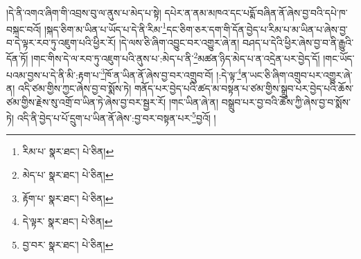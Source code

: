 །དེ་ནི་འགའ་ཞིག་གི་འབྲས་བུ་ལ་ནུས་པ་མེད་པ་སྟེ། དཔེར་ན་ནམ་མཁའ་དང་པདྨོ་བཞིན་ནོ་ཞེས་བྱ་བའི་དཔེ་ཁ་བསྐང་བའོ། །སྐད་ཅིག་མ་ཡིན་པ་ཡོད་པ་དེ་ནི་རིམ་\footnote{རིམ་པ་  སྣར་ཐང་།  པེ་ཅིན། }དང་ཅིག་ཅར་དག་གི་དོན་བྱེད་པ་རིམ་པ་མ་ཡིན་པ་ཞེས་བྱ་བ་དེ་ལྟར་རབ་ཏུ་འཇུག་པའི་ཕྱིར་རོ། །དེ་ལས་ཅི་ཞིག་འབྱུང་བར་འགྱུར་ཞེ་ན། བཤད་པ་དེའི་ཕྱིར་ཞེས་བྱ་བ་ནི་རྒྱུའི་དོན་ཏོ། །གང་གིས་དེ་ལ་རབ་ཏུ་འཇུག་པའི་ནུས་པ་:མེད་པ་ནི་\footnote{མེད་པ་  སྣར་ཐང་།  པེ་ཅིན། }མཚན་ཉིད་མེད་པ་ན་འདྲེན་པར་བྱེད་དོ། །གང་ཡོད་པའམ་བྱས་པ་དེ་ནི་མི་:རྟག་པ་\footnote{རྟོག་པ་  སྣར་ཐང་།  པེ་ཅིན། }ཁོ་ན་ཡིན་ནོ་ཞེས་བྱ་བར་འགྲུབ་བོ། །:དེ་ལྟ་\footnote{དེ་ལྟར་  སྣར་ཐང་།  པེ་ཅིན། }ན་ཡང་ཅི་ཞིག་འགྲུབ་པར་འགྱུར་ཞེ་ན། འདི་ཙམ་གྱིས་ཀྱང་ཞེས་བྱ་བ་སྨོས་ཏེ། གནོད་པར་བྱེད་པའི་ཚད་མ་བསྟན་པ་ཙམ་གྱིས་སྒྲུབ་པར་བྱེད་པའི་ཆོས་ཙམ་གྱིས་རྗེས་སུ་འགྲོ་བ་ཡིན་ཏེ་ཞེས་བྱ་བར་སྦྱར་རོ། །གང་ཡིན་ཞེ་ན། བསྒྲུབ་པར་བྱ་བའི་ཆོས་ཀྱི་ཞེས་བྱ་བ་སྨོས་ཏེ། འདི་ནི་བྱེད་པ་པོ་དྲུག་པ་ཡིན་ནོ་ཞེས་:བྱ་བར་བསྟན་པར་\footnote{བྱ་བར་  སྣར་ཐང་།  པེ་ཅིན། }བྱའོ། །
